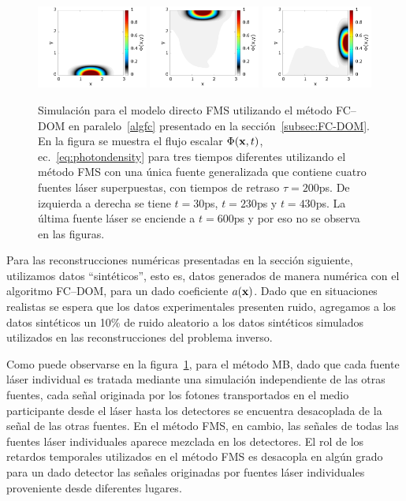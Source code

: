 \begin{figure}[h!]
\centering
  \includegraphics[width=0.325\textwidth]{figuras/sim_t30_FMS.png}
  \includegraphics[width=0.325\textwidth]{figuras/sim_t230_FMS.png}
  \includegraphics[width=0.325\textwidth]{figuras/sim_t430_FMS.png}
  \caption{Simulación para el modelo directo FMS utilizando 
  el método FC--DOM en paralelo~\ref{algfc} presentado en 
  la sección~\ref{subsec:FC-DOM}. En la figura se muestra el 
  flujo escalar $\Phi(\mathbf{x},t)$, ec.~\eqref{eq:photondensity} para tres tiempos 
  diferentes utilizando el método FMS con una única fuente generalizada 
  que contiene cuatro fuentes láser superpuestas, con tiempos de retraso $\tau=200$ps. De 
  izquierda a derecha se tiene $t=30$ps, $t=230$ps y $t=430$ps. La última fuente 
  láser se enciende a $t=600$ps y por eso no se observa en las figuras.}
 \label{fig:photonflux2}
\end{figure}

Para las reconstrucciones numéricas presentadas en la sección siguiente, utilizamos 
datos ``sintéticos'', esto es, datos generados de manera numérica 
con el algoritmo FC--DOM, para un dado 
coeficiente $a(\mathbf{x})$. Dado que en situaciones realistas se espera 
que los datos experimentales presenten ruido, agregamos a los 
datos sintéticos un 10\% de ruido aleatorio a los datos sintéticos simulados 
utilizados en las reconstrucciones del problema inverso. 


Como puede observarse en la figura~\ref{fig:photonflux2}, para el método 
MB, dado que cada fuente láser individual es tratada mediante una simulación 
independiente de las otras fuentes, cada señal originada por los fotones 
transportados en el medio participante desde el láser hasta los detectores 
se encuentra desacoplada de la señal de las otras fuentes. En el método 
FMS, en cambio, las señales de todas las fuentes láser individuales 
aparece mezclada en los detectores.  El rol de los retardos temporales 
utilizados en el método FMS es desacopla en algún grado para 
un dado detector las señales 
originadas por fuentes láser individuales proveniente desde diferentes lugares.  

